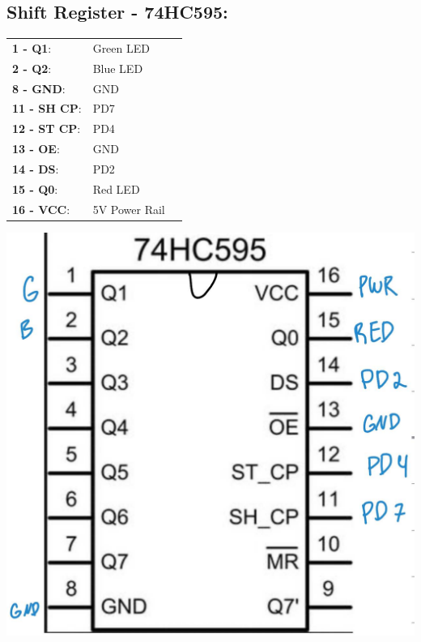 \documentclass[12pt]{article}
\begin{document}
\subsection*{Shift Register - 74HC595:}
\begin{minipage}{0.6\textwidth}
\begin{tabular}{ l l l }
   \textbf{1 - Q1}: & Green LED & \quad  \\
   \textbf{2 - Q2}: & Blue LED & \quad  \\
   \textbf{8 - GND}: & GND & \quad  \\
   \textbf{11 - SH CP}: & PD7 & \quad  \\
   \textbf{12 - ST CP}: & PD4 & \quad  \\
   \textbf{13 - OE}: & GND & \quad  \\
   \textbf{14 - DS}: & PD2 & \quad  \\
   \textbf{15 - Q0}: & Red LED & \quad  \\
   \textbf{16 - VCC}: & 5V Power Rail & \quad  \\
\end{tabular}
\end{minipage}%
\hfill
\begin{minipage}{0.45\textwidth}
    \centering
    \includegraphics[width=\textwidth]{Shift.jpg}
\end{minipage}
\end{document}
